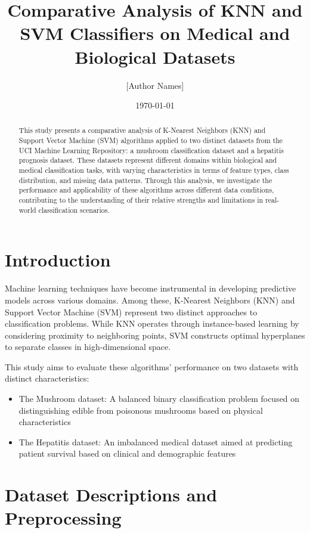 \title{Comparative Analysis of KNN and SVM Classifiers on Medical and Biological Datasets}
\author{[Author Names]}
\date{\today}


\maketitle

\begin{abstract}
This study presents a comparative analysis of K-Nearest Neighbors (KNN) and Support Vector Machine (SVM) algorithms applied to two distinct datasets from the UCI Machine Learning Repository: a mushroom classification dataset and a hepatitis prognosis dataset. These datasets represent different domains within biological and medical classification tasks, with varying characteristics in terms of feature types, class distribution, and missing data patterns. Through this analysis, we investigate the performance and applicability of these algorithms across different data conditions, contributing to the understanding of their relative strengths and limitations in real-world classification scenarios.
\end{abstract}

\section{Introduction}
Machine learning techniques have become instrumental in developing predictive models across various domains. Among these, K-Nearest Neighbors (KNN) and Support Vector Machine (SVM) represent two distinct approaches to classification problems. While KNN operates through instance-based learning by considering proximity to neighboring points, SVM constructs optimal hyperplanes to separate classes in high-dimensional space.

This study aims to evaluate these algorithms' performance on two datasets with distinct characteristics:
\begin{itemize}
    \item The Mushroom dataset: A balanced binary classification problem focused on distinguishing edible from poisonous mushrooms based on physical characteristics
    \item The Hepatitis dataset: An imbalanced medical dataset aimed at predicting patient survival based on clinical and demographic features
\end{itemize}

\section{Dataset Descriptions and Preprocessing}

